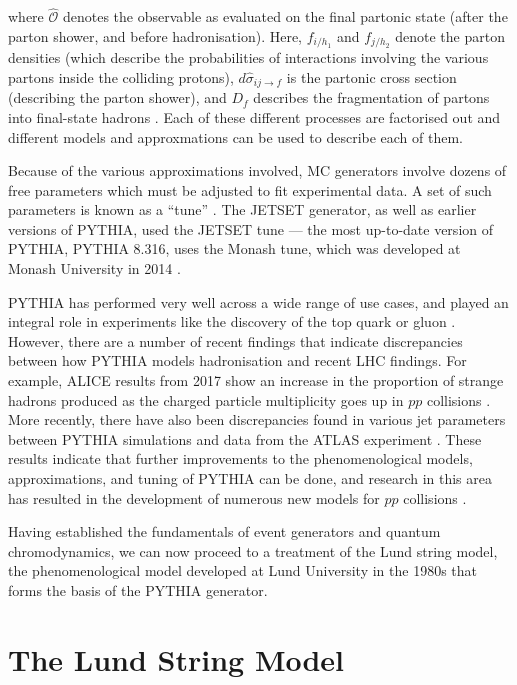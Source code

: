 \documentclass[12pt,a4paper]{report}
\begin{document}
where $\hat{\mathcal{O}}$ denotes the observable as evaluated on the final partonic state (after the parton shower, and before hadronisation). Here, $f_{i/h_1}$ and $f_{j/h_2}$ denote the parton densities (which describe the probabilities of interactions involving the various partons inside the colliding protons), $d\hat{\sigma}_{ij\rightarrow f}$ is the partonic cross section (describing the parton shower), and $D_f$ describes the fragmentation of partons into final-state hadrons \cite{Skands:2012ts}. Each of these different processes are factorised out and different models and approxmations can be used to describe each of them.

Because of the various approximations involved, MC generators involve dozens of free parameters which must be adjusted to fit experimental data. A set of such parameters is known as a ``tune'' \cite{Bierlich:2022pfr,Buckley:2011ms}. The JETSET generator, as well as earlier versions of PYTHIA, used the JETSET tune --- the most up-to-date version of PYTHIA, PYTHIA 8.316, uses the Monash tune, which was developed at Monash University in 2014 \cite{Bierlich:2022pfr,Skands:2014pea}.

PYTHIA has performed very well across a wide range of use cases, and played an integral role in experiments like the discovery of the top quark \cite{CDF:1995wbb, D0:1995jca} or gluon \cite{JADE:1979rke}. However, there are a number of recent findings that indicate discrepancies between how PYTHIA models hadronisation and recent LHC findings. For example, ALICE results from 2017 show an increase in the proportion of strange hadrons produced as the charged particle multiplicity goes up in $pp$ collisions \cite{ALICE:2016fzo}. More recently, there have also been discrepancies found in various jet parameters between PYTHIA simulations and data from the ATLAS experiment \cite{ATLAS:2024png}. These results indicate that further improvements to the phenomenological models, approximations, and tuning of PYTHIA can be done, and research in this area has resulted in the development of numerous new models for $pp$ collisions \cite{Altmann:2024odn,Bierlich:2014xba,Bergman}.

Having established the fundamentals of event generators and quantum chromodynamics, we can now proceed to a treatment of the Lund string model, the phenomenological model developed at Lund University in the 1980s that forms the basis of the PYTHIA generator.

\section{The Lund String Model}
\label{sec:lsm}
\end{document}

